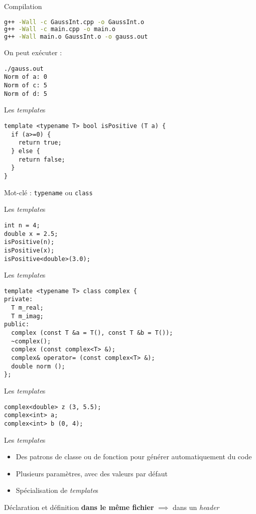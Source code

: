 \begin{frame}[fragile]{Compilation}
  \begin{lstlisting}[language=bash]
g++ -Wall -c GaussInt.cpp -o GaussInt.o
g++ -Wall -c main.cpp -o main.o
g++ -Wall main.o GaussInt.o -o gauss.out
  \end{lstlisting}

  On peut exécuter :
  \begin{lstlisting}
./gauss.out
Norm of a: 0
Norm of c: 5
Norm of d: 5
  \end{lstlisting}
\end{frame}

\begin{frame}[fragile]{Les \textit{template}s}
  \begin{lstlisting}
template <typename T> bool isPositive (T a) {
  if (a>=0) {
    return true;
  } else {
    return false;
  }
}
  \end{lstlisting}

  Mot-clé : \texttt{typename} ou \texttt{class}
\end{frame}

\begin{frame}[fragile]{Les \textit{template}s}
  \begin{lstlisting}
int n = 4;
double x = 2.5;
isPositive(n);
isPositive(x);
isPositive<double>(3.0);
  \end{lstlisting}
\end{frame}

\begin{frame}[fragile]{Les \textit{template}s}
  \begin{lstlisting}
template <typename T> class complex {
private:
  T m_real;
  T m_imag;
public:
  complex (const T &a = T(), const T &b = T());
  ~complex();
  complex (const complex<T> &);
  complex& operator= (const complex<T> &);
  double norm ();
};
  \end{lstlisting}
\end{frame}

\begin{frame}[fragile]{Les \textit{template}s}
  \begin{lstlisting}
complex<double> z (3, 5.5);
complex<int> a;
complex<int> b (0, 4);
  \end{lstlisting}
\end{frame}

\begin{frame}{Les \textit{template}s}
  \begin{itemize}
  \item  Des patrons de classe ou de fonction pour générer automatiquement du code
  \item Plusieurs paramètres, avec des valeurs par défaut
  \item Spécialisation de \textit{template}s
  \end{itemize}

  Déclaration et définition \textbf{dans le même fichier} $\implies$ dans un \textit{header}
\end{frame}

